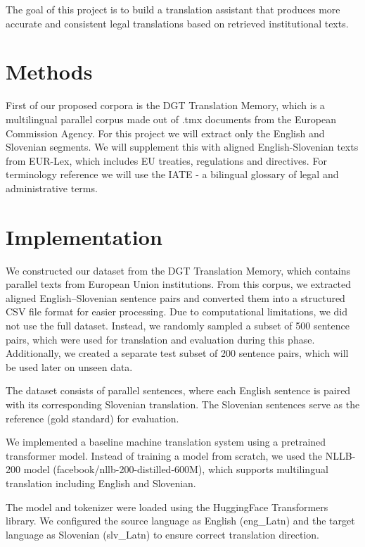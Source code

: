\documentclass[fleqn,moreauthors,10pt]{ds_report}
\begin{document}
The goal of this project is to build a translation assistant that produces more accurate and consistent legal translations based on retrieved institutional texts. 

\section*{Methods}

First of our proposed corpora is the DGT Translation Memory, which is a multilingual parallel corpus made out of .tmx documents from the European Commission Agency\cite{DGT_Translation_Memory}. For this project we will extract only the English and Slovenian segments. We will supplement this with aligned English-Slovenian texts from EUR-Lex, which includes EU treaties, regulations and directives\cite{EUR-Lex}. For terminology reference we will use the IATE - a bilingual glossary of legal and administrative terms\cite{IATE_-_Interactive_Terminology_for_Europe}. 

\section*{Implementation}
We constructed our dataset from the DGT Translation Memory, which contains parallel texts from European Union institutions. From this corpus, we extracted aligned English–Slovenian sentence pairs and converted them into a structured CSV file format for easier processing.
Due to computational limitations, we did not use the full dataset. Instead, we randomly sampled a subset of 500 sentence pairs, which were used for translation and evaluation during this phase. Additionally, we created a separate test subset of 200 sentence pairs, which will be used later on unseen data.

The dataset consists of parallel sentences, where each English sentence is paired with its corresponding Slovenian translation. The Slovenian sentences serve as the reference (gold standard) for evaluation.

We implemented a baseline machine translation system using a pretrained transformer model. Instead of training a model from scratch, we used the NLLB-200 model (facebook/nllb-200-distilled-600M), which supports multilingual translation including English and Slovenian.

The model and tokenizer were loaded using the HuggingFace Transformers library. We configured the source language as English (eng\_Latn) and the target language as Slovenian (slv\_Latn) to ensure correct translation direction.
\end{document}
